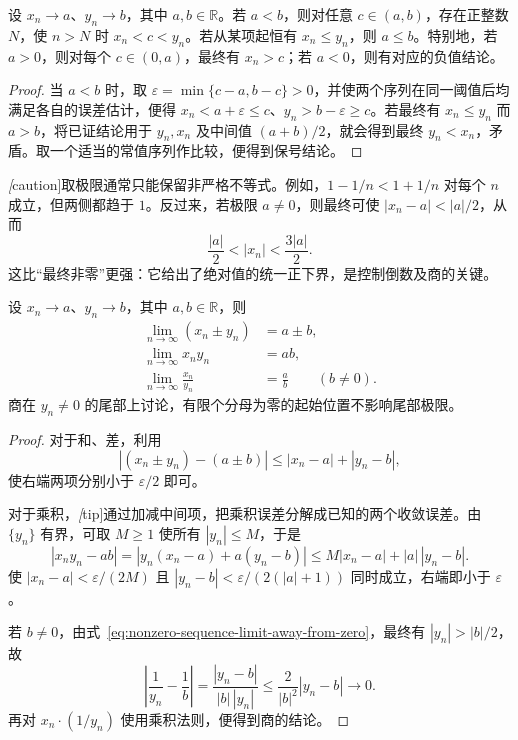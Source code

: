 \begin{theorem}[保序性与最终保号性]
\label{thm:sequence-limit-order-properties}
设 $x_n\to a$、$y_n\to b$，其中 $a,b\in\mathbb{R}$。若 $a<b$，则对任意 $c\in(a,b)$，存在正整数 $N$，使 $n>N$ 时 $x_n<c<y_n$。若从某项起恒有 $x_n\leq y_n$，则 $a\leq b$。特别地，若 $a>0$，则对每个 $c\in(0,a)$，最终有 $x_n>c$；若 $a<0$，则有对应的负值结论。
\end{theorem}

\begin{proof}
当 $a<b$ 时，取 $\varepsilon=\min\{c-a,b-c\}>0$，并使两个序列在同一阈值后均满足各自的误差估计，便得 $x_n<a+\varepsilon\leq c$、$y_n>b-\varepsilon\geq c$。若最终有 $x_n\leq y_n$ 而 $a>b$，将已证结论用于 $y_n,x_n$ 及中间值 $(a+b)/2$，就会得到最终 $y_n<x_n$，矛盾。取一个适当的常值序列作比较，便得到保号结论。
\end{proof}

\emph[caution]{取极限通常只能保留非严格不等式。}例如，$1-1/n<1+1/n$ 对每个 $n$ 成立，但两侧都趋于 $1$。反过来，若极限 $a\neq0$，则最终可使 $|x_n-a|<|a|/2$，从而
\begin{equation}
    \frac{|a|}{2}<|x_n|<\frac{3|a|}{2}.
    \label{eq:nonzero-sequence-limit-away-from-zero}
\end{equation}
这比“最终非零”更强：它给出了绝对值的统一正下界，是控制倒数及商的关键。

\begin{theorem}[极限的四则运算]
\label{thm:sequence-limit-arithmetic}
设 $x_n\to a$、$y_n\to b$，其中 $a,b\in\mathbb{R}$，则
\begin{equation}
    \begin{aligned}
        \lim_{n\to\infty}(x_n\pm y_n)&=a\pm b,\\
        \lim_{n\to\infty}x_ny_n&=ab,\\
        \lim_{n\to\infty}\frac{x_n}{y_n}&=\frac ab\qquad(b\neq0).
    \end{aligned}
    \label{eq:sequence-limit-arithmetic}
\end{equation}
商在 $y_n\neq0$ 的尾部上讨论，有限个分母为零的起始位置不影响尾部极限。
\end{theorem}

\begin{proof}
对于和、差，利用
\[
    |(x_n\pm y_n)-(a\pm b)|\leq|x_n-a|+|y_n-b|,
\]
使右端两项分别小于 $\varepsilon/2$ 即可。

对于乘积，\emph[tip]{通过加减中间项，把乘积误差分解成已知的两个收敛误差。}由 $\{y_n\}$ 有界，可取 $M\geq1$ 使所有 $|y_n|\leq M$，于是
\[
    |x_ny_n-ab|
    =|y_n(x_n-a)+a(y_n-b)|
    \leq M|x_n-a|+|a|\,|y_n-b|.
\]
使 $|x_n-a|<\varepsilon/(2M)$ 且 $|y_n-b|<\varepsilon/(2(|a|+1))$ 同时成立，右端即小于 $\varepsilon$。

若 $b\neq0$，由式~\eqref{eq:nonzero-sequence-limit-away-from-zero}，最终有 $|y_n|>|b|/2$，故
\[
    \left|\frac1{y_n}-\frac1b\right|
    =\frac{|y_n-b|}{|b|\,|y_n|}
    \leq\frac2{|b|^2}|y_n-b|\to0.
\]
再对 $x_n\cdot(1/y_n)$ 使用乘积法则，便得到商的结论。
\end{proof}

